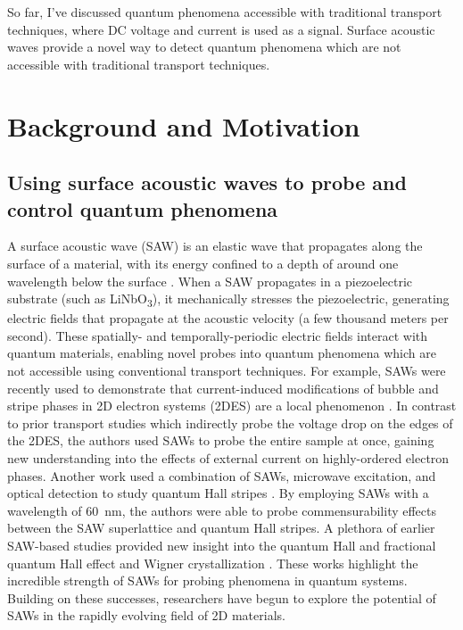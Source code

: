 \documentclass[double,12pt,1in]{beavtex}
\begin{document}
So far, I've discussed quantum phenomena accessible with traditional transport techniques, where DC voltage and current is used as a signal. Surface acoustic waves provide a novel way to detect quantum phenomena which are not accessible with traditional transport techniques.


\section{Background and Motivation}
\subsection{Using surface acoustic waves to probe and control quantum phenomena}


A surface acoustic wave (SAW) is an elastic wave that propagates along the surface of a
material, with its energy confined to a depth of around one wavelength below the surface \cite{rayleigh_waves_1885}. When a SAW propagates in a piezoelectric substrate (such as LiNbO\textsubscript{3}), it mechanically stresses the piezoelectric, generating electric fields that propagate at the acoustic velocity (a few thousand meters per second). These spatially- and temporally-periodic electric fields interact with quantum materials, enabling novel probes into quantum phenomena which are not accessible using conventional transport techniques. For example, SAWs were recently used to demonstrate that current-induced modifications of bubble and stripe phases in 2D electron systems (2DES) are a local phenomenon \cite{friess_current_2018}. In contrast to prior transport studies which indirectly probe the voltage drop on the edges of the 2DES, the authors used SAWs to probe the entire sample at once, gaining new understanding into the effects of external current on highly-ordered electron phases. Another work used a combination of SAWs, microwave excitation, and optical detection to study quantum Hall stripes \cite{kukushkin_collective_2011}. By employing SAWs with a wavelength of \SI{60}{\nano\meter}, the authors were able to probe commensurability effects between the SAW superlattice and quantum Hall stripes. A plethora of earlier SAW-based studies provided new insight into the quantum Hall and fractional quantum Hall effect \cite{wixforth_quantum_1986,esslinger_acoustoelectric_1992,esslinger_ultrasonic_1994,kukushkin_collective_2011,willett_experimental_1993} and Wigner crystallization \cite{paalanen_rf_1992}. These works highlight the incredible strength of SAWs for probing phenomena in quantum systems. Building on these successes, researchers have begun to explore the potential of SAWs in the rapidly evolving field of 2D materials.
\end{document}
